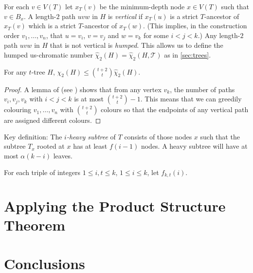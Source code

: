\documentclass[kpfonts]{patmorin}
\newcommand{\uqs}{\chi_2}
\newcommand{\hus}{\hat{\chi}_2}
\begin{document}
For each $v\in V(T)$ let $x_T(v)$ be the minimum-depth node $x\in V(T)$ such that $v\in B_x$.  A length-$2$ path $uvw$ in $H$ is \emph{vertical} if $x_T(u)$ is a strict $T$-ancestor of $x_T(v)$ which is a strict $T$-ancestor of $x_T(w)$. (This implies, in the construction order $v_1,\ldots,v_n$, that $u=v_i$, $v=v_j$ and $w=v_k$ for some $i<j<k$.) Any length-$2$ path $uvw$ in $H$ that is not vertical is \emph{humped}.  This allows us to define the humped us-chromatic number $\hus(H)=\hus(H,\mathcal{T})$ as in \cref{sec:trees}.

\begin{lem}
    For any $t$-tree $H$, $\uqs(H)\le \binom{t+2}{t}\hus(H)$.
\end{lem}

\begin{proof}
    A lemma of \citet{pilipczuk.siebertz:polynomial} (see \cite[Lemma~13]{pilipczuk.siebertz.polynomial-arxiv}) shows that from any vertex $v_k$, the number of paths $v_i,v_j,v_k$ with $i<j<k$ is at most $\binom{t+2}{t}-1$.  This means that we can greedily colouring $v_1,\ldots,v_n$ with $\binom{t+2}{t}$ colours so that the endpoints of any vertical path are assigned different colours.
\end{proof}

Key definition:  The \emph{$i$-heavy subtree} of $T$ consists of those nodes $x$ such that the subtree $T_x$ rooted at $x$ has at least $f(i-1)$ nodes.  A heavy subtree will have at most $\alpha(k-i)$ leaves.


For each triple of integers $1\le i,t \le k$, $1\le i\le k$, let $f_{k,t}(i)$.


\section{Applying the Product Structure Theorem}


\section{Conclusions}




\end{document}
